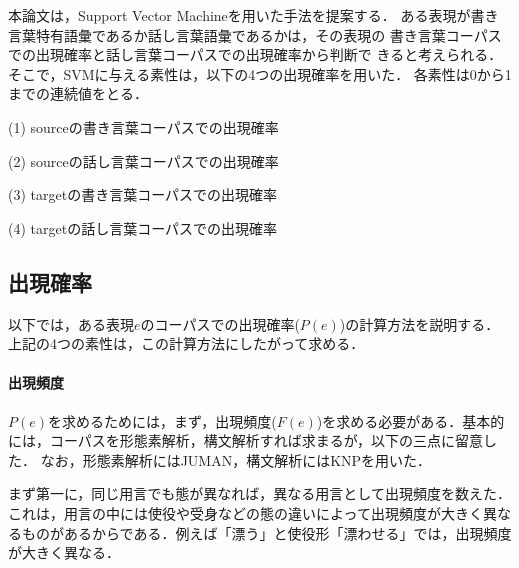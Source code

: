 \documentclass{nlp}
\begin{document}
本論文は，Support Vector Machine\cite{Vapnik95}を用いた手法を提案する．
ある表現が書き言葉特有語彙であるか話し言葉語彙であるかは，その表現の
書き言葉コーパスでの出現確率と話し言葉コーパスでの出現確率から判断で
きると考えられる．そこで，SVMに与える素性は，以下の4つの出現確率を用いた．
各素性は0から1までの連続値をとる．
\begin{list}{}{}
 \item[(1)] sourceの書き言葉コーパスでの出現確率
 \item[(2)] sourceの話し言葉コーパスでの出現確率
 \item[(3)] targetの書き言葉コーパスでの出現確率
 \item[(4)] targetの話し言葉コーパスでの出現確率
\end{list}


\subsection{出現確率}
以下では，ある表現$e$のコーパスでの出現確率($P(e)$)の計算方法を説明する．
上記の4つの素性は，この計算方法にしたがって求める．

\paragraph{出現頻度}
$P(e)$を求めるためには，まず，出現頻度($F(e)$)を求める必要がある．基本的
には，コーパスを形態素解析，構文解析すれば求まるが，以下の三点に留意した．
なお，形態素解析にはJUMAN，構文解析にはKNPを用いた．

まず第一に，同じ用言でも態が異なれば，異なる用言として出現頻度を数えた．
これは，用言の中には使役や受身などの態の違いによって出現頻度が大きく異な
るものがあるからである．例えば「漂う」と使役形「漂わせる」では，出現頻度
が大きく異なる．
\end{document}
